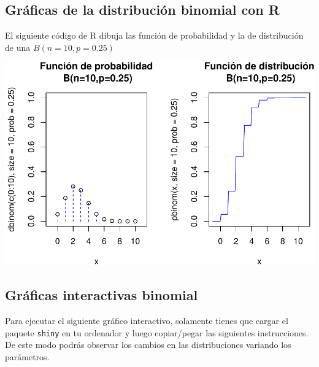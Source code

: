 \documentclass[]{book}
\begin{document}
\hypertarget{gruxe1ficas-de-la-distribuciuxf3n-binomial-con-r-1}{%
\subsection{Gráficas de la distribución binomial con R}\label{gruxe1ficas-de-la-distribuciuxf3n-binomial-con-r-1}}

El siguiente código de R dibuja las función de probabilidad y la de distribución de una \(B(n=10,p=0.25)\)

\begin{center}\includegraphics{curso-probabilidad-udemy_files/figure-latex/unnamed-chunk-25-1} \end{center}

\hypertarget{gruxe1ficas-interactivas-binomial}{%
\subsection{Gráficas interactivas binomial}\label{gruxe1ficas-interactivas-binomial}}

Para ejecutar el siguiente gráfico interactivo, solamente tienes que cargar el paquete \texttt{shiny} en tu ordenador y luego copiar/pegar las siguientes instrucciones. De este modo podrás observar los cambios en las distribuciones variando los parámetros.
\end{document}

